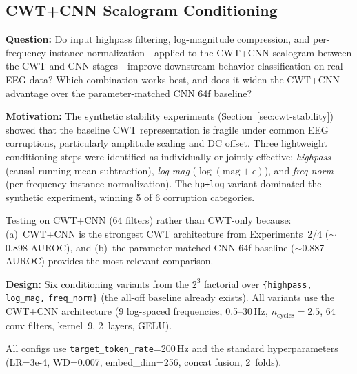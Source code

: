 \documentclass[11pt, a4paper]{article}
\begin{document}
\subsection{CWT+CNN Scalogram Conditioning}
\label{sec:cwt-conditioning}

\textbf{Question:} Do input highpass filtering, log-magnitude
compression, and per-frequency instance normalization---applied to the
CWT+CNN scalogram between the CWT and CNN stages---improve downstream
behavior classification on real EEG data?  Which combination works
best, and does it widen the CWT+CNN advantage over the
parameter-matched CNN 64f baseline?

\textbf{Motivation:} The synthetic stability experiments
(Section~\ref{sec:cwt-stability}) showed that the baseline CWT
representation is fragile under common EEG corruptions, particularly
amplitude scaling and DC offset.  Three lightweight conditioning
steps were identified as individually or jointly effective:
\emph{highpass} (causal running-mean subtraction), \emph{log-mag}
($\log(\text{mag} + \epsilon)$), and \emph{freq-norm} (per-frequency
instance normalization).  The \texttt{hp+log} variant dominated the
synthetic experiment, winning 5 of 6 corruption categories.

Testing on CWT+CNN (64 filters) rather than CWT-only because:
(a)~CWT+CNN is the strongest CWT architecture from Experiments~2/4
($\sim$0.898 AUROC), and (b)~the parameter-matched CNN 64f baseline
($\sim$0.887 AUROC) provides the most relevant comparison.

\textbf{Design:} Six conditioning variants from the $2^3$ factorial
over \texttt{\{highpass,} \texttt{log\_mag,} \texttt{freq\_norm\}}
(the all-off baseline already exists).  All variants use the CWT+CNN
architecture (9 log-spaced frequencies, 0.5--30\,Hz,
$n_\text{cycles}\!=\!2.5$, 64 conv filters, kernel~9, 2~layers,
GELU).

All configs use \texttt{target\_token\_rate}=200\,Hz and the standard
hyperparameters (LR=3e-4, WD=0.007, embed\_dim=256, concat fusion,
2~folds).
\end{document}
